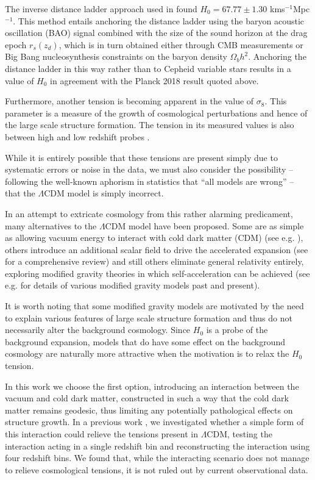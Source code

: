 \documentclass[final,3p,times,twocolumn]{elsarticle}
\newcommand*{\kmsMpc}{kms$^{-1}$Mpc$^{-1}$}
\begin{document}
The inverse distance ladder approach used in \citep{Macaulay:2018fxi} found $H_0 = 67.77 \pm 1.30$ \kmsMpc. This method entails anchoring the distance ladder using the baryon acoustic oscillation (BAO) signal combined with the size of the sound horizon at the drag epoch $r_s(z_d)$, which is in turn obtained either through CMB measurements or Big Bang nucleosynthesis constraints on the baryon density $\Omega_b h^2$. Anchoring the distance ladder in this way rather than to Cepheid variable stars results in a value of $H_0$ in agreement with the Planck 2018 result quoted above.

Furthermore, another tension is becoming apparent in the value of $\sigma_8$. This parameter is a measure of the growth of cosmological perturbations and hence of the large scale structure formation. The tension in its measured values is also between high and low redshift probes \citep{Battye:2014qga, Douspis:2018xlj}.

While it is entirely possible that these tensions are present simply due to systematic errors or noise in the data, we must also consider the possibility -- following the well-known aphorism in statistics that ``all models are wrong'' \citep{Box1976} -- that the $\Lambda$CDM model is simply incorrect.

In an attempt to extricate cosmology from this rather alarming predicament, many alternatives to the $\Lambda$CDM model have been proposed. Some are as simple as allowing vacuum energy to interact with cold dark matter (CDM) (see e.g. \cite{Wands:2012vg, Salvatelli2014, Sola:2017lxc, Kumar:2017dnp, Martinelli:2019dau, Pan2019, Pan:2020zza}), others introduce an additional scalar field to drive the accelerated expansion (see \cite{Copeland2006} for a comprehensive review) and still others eliminate general relativity entirely, exploring modified gravity theories in which self-acceleration can be achieved (see e.g. \cite{Clifton2012, Joyce2016, Ezquiaga2017, Frusciante:2019xia} for details of various modified gravity models past and present).

It is worth noting that some modified gravity models are motivated by the need to explain various features of large scale structure formation and thus do not necessarily alter the background cosmology. Since $H_0$ is a probe of the background expansion, models that do have some effect on the background cosmology are naturally more attractive when the motivation is to relax the $H_0$  tension.

In this work we choose the first option, introducing an interaction between the vacuum and cold dark matter, constructed in such a way that the cold dark matter remains geodesic, thus limiting any potentially pathological effects on structure growth. In a previous work \citep{Martinelli:2019dau}, we investigated whether a simple form of this interaction could relieve the tensions present in $\Lambda$CDM, testing the interaction acting in a single redshift bin and reconstructing the interaction using four redshift bins. We found that, while the interacting scenario does not manage to relieve cosmological tensions, it is not ruled out by current observational data.
\end{document}

